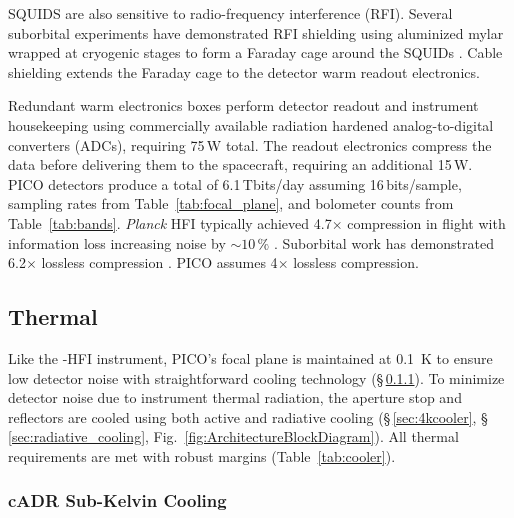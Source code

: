 SQUIDS are also sensitive to radio-frequency interference
(RFI). Several suborbital experiments have demonstrated RFI shielding
using aluminized mylar wrapped at cryogenic stages to form a Faraday
cage around the SQUIDs \citep{Kermish2012,EBEX2018,BICEP2014}.
 Cable shielding extends the Faraday cage to
the detector warm readout electronics.

Redundant warm electronics boxes perform detector readout and
instrument housekeeping using commercially available radiation
hardened analog-to-digital converters (ADCs), requiring 75\,W total.
The readout electronics compress the data before delivering them to
the spacecraft, requiring an additional 15\,W. PICO detectors produce
a total of 6.1\,Tbits/day assuming 16\,bits/sample, sampling rates
from Table~\ref{tab:focal_plane}, and bolometer counts from
Table~\ref{tab:bands}. \textit{Planck} HFI typically achieved
4.7$\times$ compression in flight with information loss increasing
noise by $\sim10\,\%$ \citep{Pajot2018,PlanckHFI2011}. Suborbital work
has demonstrated 6.2$\times$ lossless compression
\citep{EBEX2017}. PICO assumes 4$\times$ lossless compression.

\subsection{Thermal}
\label{sec:thermal} %

Like the \planck -HFI instrument, PICO's focal plane is maintained at 0.1~K to ensure low detector noise with straightforward cooling technology (\S\,\ref{sec:cadr}). To minimize detector noise due to instrument thermal radiation, the aperture stop and reflectors are cooled using both active and radiative cooling (\S\,\ref{sec:4kcooler}, \S\,\ref{sec:radiative_cooling}, Fig.~\ref{fig:ArchitectureBlockDiagram}).  All thermal requirements are met with robust margins (Table~\ref{tab:cooler}).



\subsubsection{cADR Sub-Kelvin Cooling}
\label{sec:cadr} %

